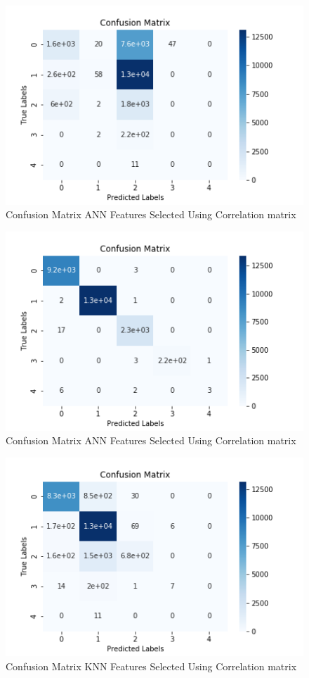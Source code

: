 \documentclass{article}
\begin{document}
\begin{figure}[htbp]
\centering
\includegraphics[scale=0.5]{figures/cm_ann_corr.png}
\caption{Confusion Matrix ANN Features Selected Using Correlation matrix}
\label{fig:dt_cm_gini_corr}
\end{figure}


\begin{figure}[htbp]
\centering
\includegraphics[scale=0.5]{figures/cm_ann_ig.png}
\caption{Confusion Matrix ANN Features Selected Using Correlation matrix}
\label{fig:dt_cm_gini_corr}
\end{figure}

\begin{figure}[htbp]
\centering
\includegraphics[scale=0.5]{figures/cm_knn_corr.png}
\caption{Confusion Matrix KNN Features Selected Using Correlation matrix}
\label{fig:dt_cm_gini_corr}
\end{figure}
\end{document}
